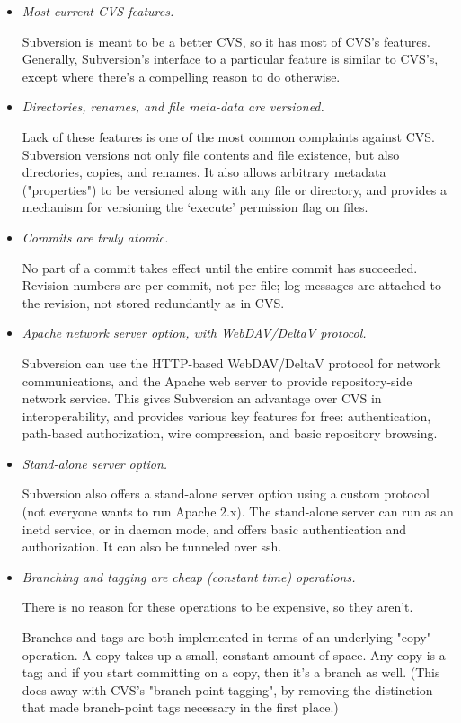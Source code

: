 \begin{itemize}
\item \emph{Most current CVS features.}

Subversion is meant to be a better CVS, so it has most of CVS's features. Generally, Subversion's
interface to a particular feature is similar to CVS's, except where there's a compelling reason
to do otherwise.

\item \emph{Directories, renames, and file meta-data are versioned.}

Lack of these features is one of the most common complaints against CVS. Subversion versions not
only file contents and file existence, but also directories, copies, and renames. It also allows
arbitrary metadata ("properties") to be versioned along with any file or directory, and provides
a mechanism for versioning the `execute' permission flag on files.

\item \emph{Commits are truly atomic.}

No part of a commit takes effect until the entire commit has succeeded. Revision numbers are
per-commit, not per-file; log messages are attached to the revision, not stored redundantly as
in CVS.

\item \emph{Apache network server option, with WebDAV/DeltaV protocol.}

Subversion can use the HTTP-based WebDAV/DeltaV protocol for network communications, and the
Apache web server to provide repository-side network service. This gives Subversion an advantage
over CVS in interoperability, and provides various key features for free: authentication,
path-based authorization, wire compression, and basic repository browsing.

\item \emph{Stand-alone server option.}

Subversion also offers a stand-alone server option using a custom protocol (not everyone wants
to run Apache 2.x). The stand-alone server can run as an inetd service, or in daemon mode, and
offers basic authentication and authorization. It can also be tunneled over ssh.

\item \emph{Branching and tagging are cheap (constant time) operations.}

There is no reason for these operations to be expensive, so they aren't.

Branches and tags are both implemented in terms of an underlying "copy" operation. A copy takes
up a small, constant amount of space. Any copy is a tag; and if you start committing on a copy,
then it's a branch as well. (This does away with CVS's "branch-point tagging", by removing the
distinction that made branch-point tags necessary in the first place.)


\end{itemize}
